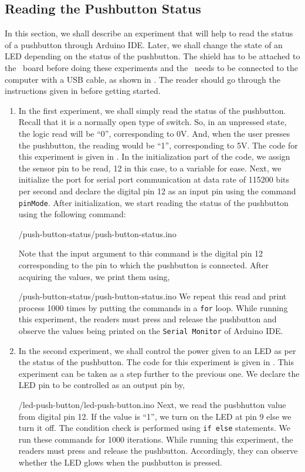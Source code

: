 \subsection{Reading the Pushbutton Status}
In this section, we shall describe an experiment that will help 
to read the status of a pushbutton through Arduino IDE. 
Later, we shall change the state of an LED depending on the status of the pushbutton. The shield has to be attached to the \arduino\ board
before doing these experiments and the \arduino\ needs to be connected to the computer 
with a USB cable, as shown in . The reader should go through the
instructions given in  before getting started.
\begin{enumerate}
\item In the first experiment, we shall simply read the status of the
  pushbutton. Recall that it is a normally open type of switch. So, in
  an unpressed state, the logic read will be ``0'', corresponding to
  0V. And, when the user presses the pushbutton, the reading would be
  ``1'', corresponding to 5V. The code for this experiment is given in
  . In the initialization part of the code, we
  assign the sensor pin to be read, 12 in this case, to a variable for
  ease. Next, we initialize the port for serial port communication at
  data rate of 115200 bits per second and declare the digital pin 12 as an 
  input pin using the command {\tt pinMode}.  After initialization, 
  we start reading the status of the pushbutton using the following command:
  
  {\LocPushardcode/push-button-status/push-button-status.ino}

  Note that the input argument to this command is the digital pin 12
  corresponding to the pin to which the pushbutton is connected.  After
  acquiring the values, we print them using,
  
  {\LocPushardcode/push-button-status/push-button-status.ino} We
  repeat this read and print process 1000 times by putting the
  commands in a {\tt for} loop. While running this experiment, the readers must press
  and release the pushbutton and observe the values being printed on the
  {\tt Serial Monitor} of Arduino IDE.

\item In the second experiment, we shall control the power given to an
  LED as per the status of the pushbutton. The code for this
  experiment is given in . This experiment can be
  taken as a step further to the previous one. We declare the LED pin
  to be controlled as an output pin by,
  
  {\LocPushardcode/led-push-button/led-push-button.ino} Next, we read
  the pusbhutton value from digital pin 12. If the value is ``1'',
  we turn on the LED at pin 9 else we turn it off. The
  condition check is performed using {\tt if else} statements. We run
  these commands for 1000 iterations. While running this experiment, the readers 
  must press and release the pushbutton. Accordingly, they can observe whether 
  the LED glows when the pushbutton is pressed. 
\end{enumerate}


